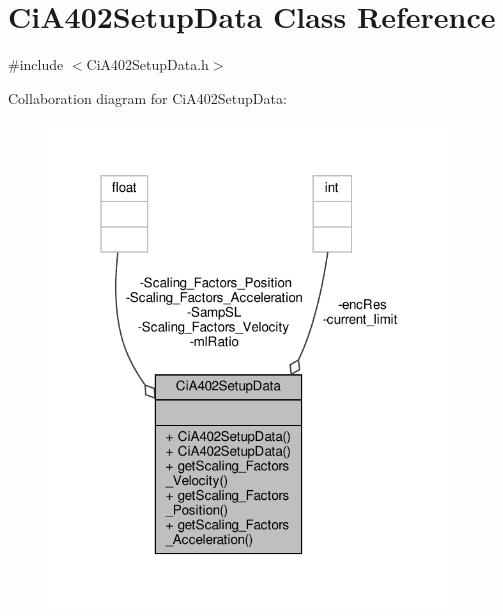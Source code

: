 \hypertarget{classCiA402SetupData}{}\section{Ci\+A402\+Setup\+Data Class Reference}
\label{classCiA402SetupData}


{\ttfamily \#include $<$Ci\+A402\+Setup\+Data.\+h$>$}



Collaboration diagram for Ci\+A402\+Setup\+Data\+:
\nopagebreak
\begin{figure}[H]
\begin{center}
\leavevmode
\includegraphics[width=304pt]{classCiA402SetupData__coll__graph}
\end{center}
\end{figure}
